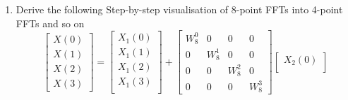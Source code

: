 \documentclass[journal,12pt,twocolumn]{IEEEtran}
\renewcommand\thesection{\arabic{section}}
\begin{document}
\begin{enumerate}[label=\arabic*.,ref=\thesection.\theenumi]
	So,
	\begin{align}
		&\vec{F}_N\vec{x}=\vec{F}_N\vec{x}_1\\
		&=\begin{bmatrix}
			W_N^{0\times0}&W_N^{0\times1}&..&W_N^{0\times N-1}\\
			..&..&..&..\\
			W_N^{N-1 \times 0}&W_N^{N-1 \times 1}&..&W_N^{N-1 \times N-1}
		\end{bmatrix}
	\myvec{x(0)\\x(1)\\..\\x(N-1)}\\
	&=\myvec{\sum_{n=0}^{N-1}W_N^{0\times n} x(n)\\\sum_{n=0}^{N-1}W_N^{1\times n} x(n)\\..\\\sum_{n=0}^{N-1}W_N^{N-1\times n} x(n)}\\
	&=\myvec{\sum_{n=0}^{N-1}e^{\frac{-j2\pi0\times n}{N}} x(n)\\\sum_{n=0}^{N-1}e^{\frac{-j2\pi1\times n}{N}} x(n)\\..\\\sum_{n=0}^{N-1}e^{\frac{-j2\pi (N-1)\times n}{N}} x(n)}\\
	&=\vec{X}
\end{align}
	\item Derive the following Step-by-step visualisation  of
	8-point FFTs into 4-point FFTs and so on
	\begin{equation}
		\begin{bmatrix}
			X(0) \\ 
			X(1) \\ 
			X(2) \\ 
			X(3)
		\end{bmatrix}
		=
		\begin{bmatrix}
			X_{1}(0) \\ 
			X_{1}(1)\\ 
			X_{1}(2)\\
			X_{1}(3)\\
		\end{bmatrix}
		+
		\begin{bmatrix}
			W^{0}_{8} & 0 & 0 & 0\\
			0 & W^{1}_{8} & 0 & 0\\
			0 & 0 & W^{2}_{8} & 0\\
			0 & 0 & 0 & W^{3}_{8}
		\end{bmatrix}
		\begin{bmatrix}
			X_{2}(0) \\ 

\end{bmatrix}
\end{equation}
\end{enumerate}
\end{document}
